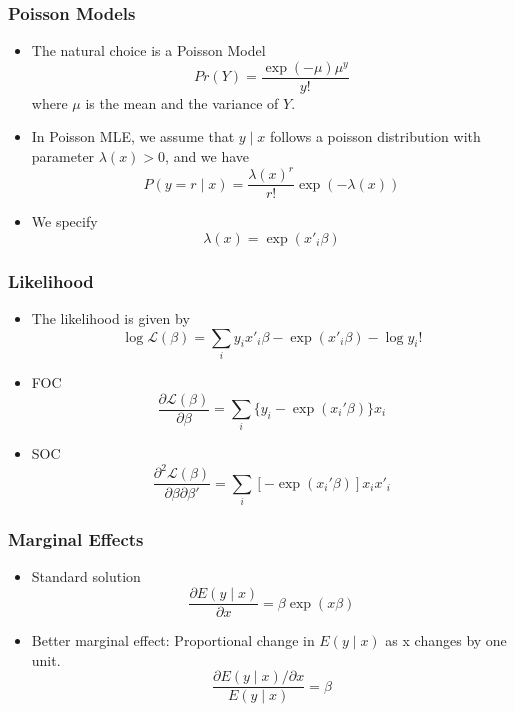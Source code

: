 \documentclass{beamer}
\newcommand{\Lik}{\mathcal{L}}
\newcommand{\1}{\mathbb{1}}
\begin{document}
\begin{frame}\frametitle{Poisson Models}
\begin{itemize}
\item The natural choice is a Poisson Model
\begin{equation*}
Pr(Y) = \dfrac{\exp(-\mu) \mu^{y}}{y!}
\end{equation*}
where $\mu$ is the mean and the variance of $Y$.
\item In Poisson MLE, we assume that $y\mid x$ follows a poisson distribution with parameter $\lambda(x)>0$, and we have
\begin{equation*}
P(y=r \mid x) = \dfrac{\lambda(x)^r}{r !} \exp(-\lambda(x))
\end{equation*}
\item We specify 
\begin{equation}
\lambda(x) = \exp(x'_i \beta) 
\end{equation}
\end{itemize}
\end{frame}

\begin{frame}\frametitle{Likelihood}
\begin{itemize}
\item The likelihood is given by 
\begin{equation}
\log \Lik(\beta) = \sum_i y_i x'_i \beta - \exp(x'_i \beta) - \log y_i !
\end{equation}
\item FOC
\begin{equation}
\dfrac{\partial \Lik(\beta)}{\partial \beta} = \sum_i \lbrace y_i - \exp(x_i'\beta) \rbrace x_i
\end{equation}
\item SOC 
\begin{equation}
\dfrac{\partial^2 \Lik(\beta)}{\partial \beta \partial \beta'} = \sum_i [- \exp(x_i'\beta)]  x_i x'_i
\end{equation}
\end{itemize}
\end{frame}

\begin{frame}\frametitle{Marginal Effects}
\begin{itemize}
\item Standard solution
\begin{equation}
\dfrac{\partial E(y \mid x)}{\partial x} = \beta \exp(x\beta) 
\end{equation}
\item Better marginal effect: Proportional change in $E(y \mid x)$ as x changes by one unit.
\begin{equation}
\dfrac{\partial E(y \mid x)/\partial x}{E(y \mid x)} = \beta 
\end{equation}
\end{itemize}
\end{frame}
\end{document}
